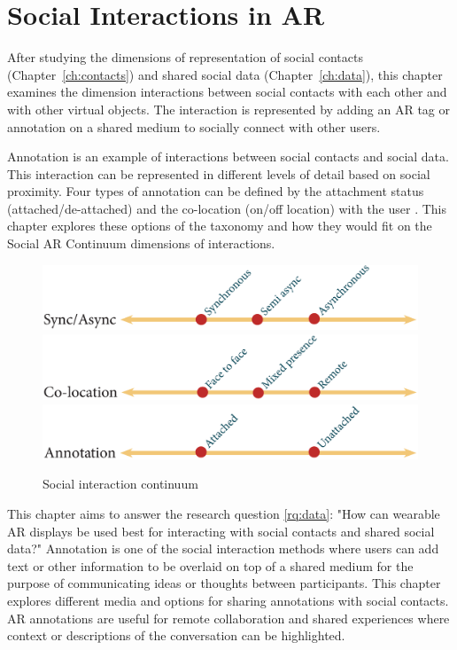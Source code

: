 \chapter{Social Interactions in AR}
\label{ch:annotation}

After studying the dimensions of representation of social contacts (Chapter~\ref{ch:contacts}) and shared social data (Chapter~\ref{ch:data}), this chapter examines the dimension interactions between social contacts with each other and with other virtual objects. The interaction is represented by adding an AR tag or annotation on a shared medium to socially connect with other users.

Annotation is an example of interactions between social contacts and social data. This interaction can be represented in different levels of detail based on social proximity. Four types of annotation can be defined by the attachment status (attached/de-attached) and the co-location (on/off location) with the user \cite{Hansen2006}. This chapter explores these options of the taxonomy and how they would fit on the Social AR Continuum dimensions of interactions. 

\begin{figure}[ht]
  \centering
  \includegraphics[width=\columnwidth]{images/30-continuum/continuum4_2-05.eps}
  \includegraphics[width=\columnwidth]{images/30-continuum/continuum4_2-06.eps}
  \includegraphics[width=\columnwidth]{images/30-continuum/continuum43-05.eps}
  \caption{Social interaction continuum}
  \label{fig:interaction:interaction-continuum}
\end{figure}

This chapter aims to answer the research question \ref{rq:data}: "How can wearable AR displays be used best for interacting with social contacts and shared social data?"
Annotation is one of the social interaction methods where users can add text or other information to be overlaid on top of a shared medium for the purpose of communicating ideas or thoughts between participants. This chapter explores different media and options for sharing annotations with social contacts. AR annotations are useful for remote collaboration and shared experiences where context or descriptions of the conversation can be highlighted.

